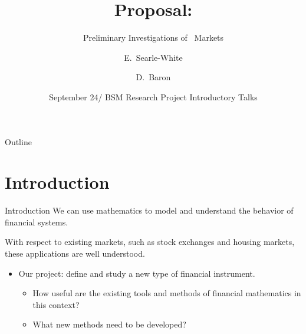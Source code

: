 \documentclass{beamer}
\title[Proposal] %
{Proposal:}
\subtitle
{Preliminary Investigations of \HEP\ Markets } %
\author[Searle-White, Baron] %
{E.~Searle-White\inst{1} \and D.~Baron\inst{2}}
\institute %
{
\inst{1}%
Mills College
\and
\inst{2}%
Western Washington University
}
\date[EUR Introduction] %
{September 24/ BSM Research Project Introductory Talks}
\begin{document}
\begin{frame}
\titlepage
\end{frame}


\begin{frame}{Outline}
\tableofcontents
\end{frame}






%


\section{Introduction}


\begin{frame}{Introduction}
We can use mathematics to model and understand the behavior of financial systems.

With respect to existing markets, such as stock exchanges and housing markets, these applications are well understood. 

\begin{itemize}
\item
Our project: define and study a new type of financial instrument.
\begin{itemize}
\item 
How useful are the existing tools and methods of financial mathematics in this context?
 \item 
What new methods need to be developed?
\end{itemize}
\end{itemize}
\end{frame}
\end{document}
